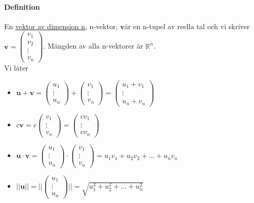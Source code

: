 \paragraph{Definition} En \underline{vektor av dimension n}, n-vektor, $\bm{v}$är en n-tupel av reella tal och vi skriver
$\bm{v}=\begin{pmatrix}
    v_{1}\\
    v_{2}\\
    \vdots\\
    v_{n}
\end{pmatrix}$.
Mängden av alla n-vektorer är $\mathbb{R}^{n}$.\\
Vi låter 
\begin{itemize}
    \item[] 
        $\bm{u}+\bm{v}=
        \begin{pmatrix}
            u_{1}\\
            \vdots\\
            u_{n}
        \end{pmatrix}
            +
        \begin{pmatrix}
            v_{1}\\
            \vdots\\
            v_{n}
        \end{pmatrix}
        =
        \begin{pmatrix}
            u_{1}+v_{1}\\
            \vdots\\
            u_{n}+v_{n}
        \end{pmatrix}$
    \item[] $c\bm{v}=c\begin{pmatrix}
        v_{1}\\
        \vdots\\
        v_{n}
    \end{pmatrix}=\begin{pmatrix}
        cv_{1}\\
        \vdots\\
        cv_{n}
    \end{pmatrix}$
    \item[] $\bm{u}\cdot \bm{v}=\begin{pmatrix}u_{1}\\\vdots\\u_{n}\end{pmatrix}\cdot\begin{pmatrix}v_{1}\\\vdots\\v_{n}\end{pmatrix}= u_{1}v_{1}+u_{2}v_{2}+\ldots+u_{n}v_{n}$
    \item[] $||\bm{u}||=||\begin{pmatrix}u_{1}\\\vdots\\u_{n}\end{pmatrix}||=\sqrt{u_{1}^{2}+u_{2}^{2}+\ldots+u_{n}^{2}}$
\end{itemize}
